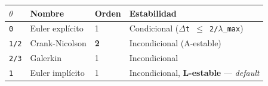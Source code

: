 \documentclass[11pt,letterpaper,oneside]{report}
\begin{document}
\begin{center}
\begin{tabularx}{\textwidth}{YYYY}
\hline
\textbf{\texttt{\ensuremath{\theta}}} & \textbf{Nombre} & \textbf{Orden} & \textbf{Estabilidad} \\
\hline
\texttt{0} & Euler explícito & 1 & Condicional (\texttt{\ensuremath{\Delta}t \ensuremath{\le} 2/\ensuremath{\lambda}\_max}) \\
\texttt{1/2} & Crank-Nicolson & \textbf{2} & Incondicional (A-estable) \\
\texttt{2/3} & Galerkin & 1 & Incondicional \\
\texttt{1} & Euler implícito & 1 & Incondicional, \textbf{L-estable} --- \textit{default} \\
\hline
\end{tabularx}
\end{center}
\end{document}
